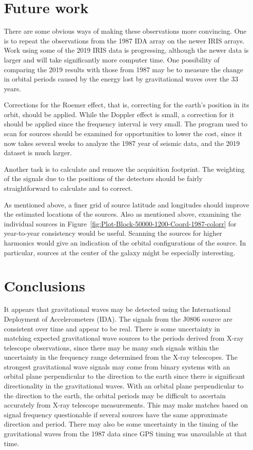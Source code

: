 \section{Future work}

There are some obvious ways of making these observations more convincing.  One is to repeat the observations from the 1987 IDA array on the newer IRIS arrays.  Work using some of the 2019 IRIS data is progressing, although the newer data is larger and will take significantly more computer time.  One possibility of comparing the 2019 results with those from 1987 may be to measure the change in orbital periods caused by the energy lost by gravitational waves over the 33 years.

Corrections for the Roemer effect, that is, correcting for the earth's position in its orbit, should be applied.  While the Doppler effect is small, a correction for it should be applied since the frequency interval is very small.  The program used to scan for sources should be examined for opportunities to lower the cost, since it now takes several weeks to analyze the 1987 year of seismic data, and the 2019 dataset is much larger.    

Another task is to calculate and remove the acquisition footprint.  The weighting of the signals due to the positions of the detectors should be fairly straightforward to calculate and to correct.

As mentioned above, a finer grid of source latitude and longitudes should improve the estimated locations of the sources.  Also as mentioned above, examining the individual sources in  Figure~\ref{fig:Plot-Block-50000-1200-Coord-1987-colorr}  for year-to-year consistency would be useful.  Scanning the sources for higher harmonics would give an indication of the orbital configurations of the source.  In particular, sources at the center of the galaxy might be especially interesting.


\section{Conclusions}

It appears that gravitational waves may be detected using the International Deployment of Accelerometers (IDA).  
The signals from the J0806 source are consistent over time and appear to be real.  
There is some uncertainty in matching expected gravitational wave sources to the periods derived from X-ray telescope observations, since there may be many such signals within the uncertainty in the frequency range determined from the X-ray telescopes.  
The strongest gravitational wave signals may come from binary systems with an orbital plane perpendicular to the direction to the earth since there is significant directionality in the gravitational waves.  
With an orbital plane perpendicular to the direction to the earth, the orbital periods may be difficult to ascertain accurately from X-ray telescope measurements.
This may make matches based on signal frequency questionable if several sources have the same approximate direction and period.   
There may also be some uncertainty in the timing of the gravitational waves from the 1987 data since GPS timing was unavailable at that time.   

